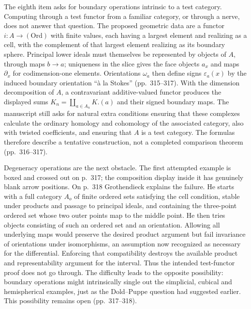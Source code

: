 The eighth item asks for boundary operations intrinsic to a test category. Computing through a test functor from a familiar category, or through a nerve, does not answer that question. The proposed geometric data are a functor $i:A\to(\mathrm{Ord})$ with finite values, each having a largest element and realizing as a cell, with the complement of that largest element realizing as its boundary sphere. Principal lower ideals must themselves be represented by objects of $A$, through maps $b\to a$; uniqueness in the slice gives the face objects $a_x$ and maps $\partial_x$ for codimension-one elements. Orientations $\omega_a$ then define signs $\varepsilon_a(x)$ by the induced boundary orientation “à la Stokes” (pp.\ 315--317). With the dimension decomposition of $A$, a contravariant additive-valued functor produces the displayed sums $K_n=\coprod_{a\in A_n}K.(a)$ and their signed boundary maps. The manuscript still asks for natural extra conditions ensuring that these complexes calculate the ordinary homology and cohomology of the associated category, also with twisted coefficients, and ensuring that $A$ is a test category. The formulas therefore describe a tentative construction, not a completed comparison theorem (pp.\ 316--317).

Degeneracy operations are the next obstacle. The first attempted example is boxed and crossed out on p.\ 317; the composition display inside it has genuinely blank arrow positions. On p.\ 318 Grothendieck explains the failure. He starts with a full category $A_o$ of finite ordered sets satisfying the cell condition, stable under products and passage to principal ideals, and containing the three-point ordered set whose two outer points map to the middle point. He then tries objects consisting of such an ordered set and an orientation. Allowing all underlying maps would preserve the desired product argument but fail invariance of orientations under isomorphisms, an assumption now recognized as necessary for the differential. Enforcing that compatibility destroys the available product and representability argument for the interval. Thus the intended test-functor proof does not go through. The difficulty leads to the opposite possibility: boundary operations might intrinsically single out the simplicial, cubical and hemispherical examples, just as the Dold--Puppe question had suggested earlier. This possibility remains open (pp.\ 317--318).

